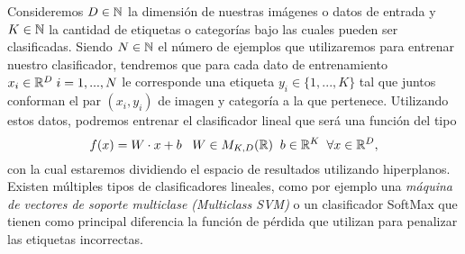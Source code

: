 Consideremos $D \in \mathbb{N}$ la dimensión de nuestras imágenes o datos de entrada y $K \in \mathbb{N}$ la cantidad de etiquetas o categorías bajo las cuales pueden ser clasificadas. Siendo $N \in \mathbb{N}$ el número de ejemplos que utilizaremos para entrenar nuestro clasificador, tendremos que para cada dato de entrenamiento $x_i \in \mathbb{R}^D \; i=1,...,N$ le corresponde una etiqueta $y_i \in \{1,...,K\}$ tal que juntos conforman el par $(x_i,y_i)$ de imagen y categoría a la que pertenece. Utilizando estos datos, podremos entrenar el clasificador lineal que será una función del tipo $$f(x)=W\cdot x+ b\; \; \; W\in M_{K,D}(\mathbb{R}) \;\; b \in \mathbb{R}^K \;\; \forall x\in \mathbb{R}^D,$$ con la cual estaremos dividiendo el espacio de resultados utilizando hiperplanos. Existen múltiples tipos de clasificadores lineales, como por ejemplo una \emph{máquina de vectores de soporte multiclase (Multiclass SVM)} o un clasificador SoftMax que tienen como principal diferencia la función de pérdida que utilizan para penalizar las etiquetas incorrectas.







